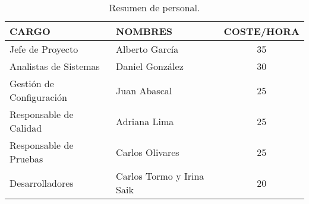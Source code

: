\documentclass[10pt,a4paper,oldfontcommands]{plantillaDPDS}
\begin{document}
\begin{table}[H]
\begin{center}
\begin{tabular}{l l c}

\textbf{CARGO} & \textbf{NOMBRES} & \textbf{COSTE/HORA}\\ \hline \hline
Jefe de Proyecto & Alberto García & 35  \\
Analistas de Sistemas & Daniel González & 30\\
Gestión de Configuración & Juan Abascal & 25\\
Responsable de Calidad & Adriana Lima & 25\\
Responsable de Pruebas & Carlos Olivares & 25\\
Desarrolladores & Carlos Tormo y  Irina Saik & 20\\ \hline \hline
\end{tabular}
\caption{Resumen de personal.}
\label{tab:personal}
\end{center}
\end{table}
\end{document}
